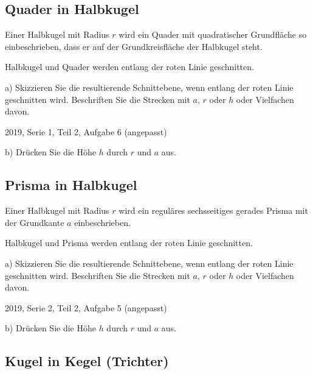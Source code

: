 
\subsection{Quader in Halbkugel}

Einer Halbkugel mit Radius $r$ wird ein Quader mit quadratischer
Grundfläche so einbeschrieben, dass er auf der Grundkreisfläche
der Halbkugel steht.

Halbkugel und Quader werden entlang der roten Linie geschnitten.


a) Skizzieren Sie die resultierende Schnittebene, wenn entlang der
roten Linie geschnitten wird. Beschriften Sie die Strecken mit $a$,
$r$ oder $h$ oder Vielfachen davon.


{\tiny{2019, Serie 1, Teil 2, Aufgabe 6 (angepasst)}}


b) Drücken Sie die Höhe $h$ durch $r$ und $a$ aus.

\subsection{Prisma in Halbkugel}
Einer Halbkugel mit Radius $r$ wird ein reguläres sechsseitiges
gerades Prisma mit der Grundkante $a$ einbeschrieben.

Halbkugel und Prisma werden entlang der roten Linie geschnitten.

a) Skizzieren Sie die resultierende Schnittebene, wenn entlang der
roten Linie geschnitten wird. Beschriften Sie die Strecken mit $a$,
$r$ oder $h$ oder Vielfachen davon.

{\tiny{2019, Serie 2, Teil 2, Aufgabe 5 (angepasst)}}


b) Drücken Sie die Höhe $h$ durch $r$ und $a$ aus.

\subsection{Kugel in Kegel (Trichter)}

